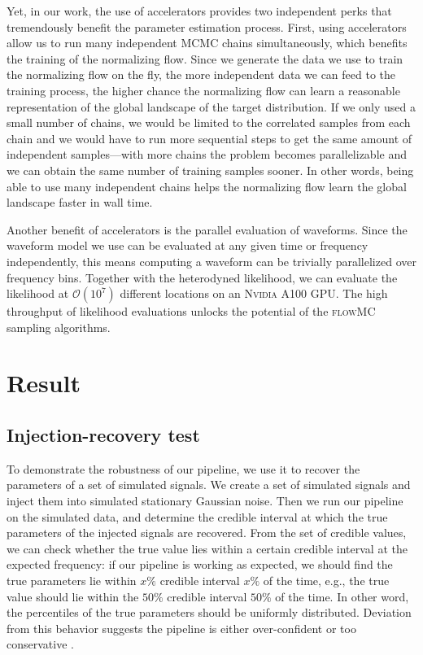 \documentclass[twocolumn]{aastex631}
\begin{document}
Yet, in our work, the use of accelerators provides two independent perks that
tremendously benefit the parameter estimation process. First, using
accelerators allow us to run many independent MCMC chains simultaneously, which
benefits the training of the normalizing flow. Since we generate the data we
use to train the normalizing flow on the fly, the more independent data we can
feed to the training process, the higher chance the normalizing flow can learn
a reasonable representation of the global landscape of the target distribution.
If we only used a small number of chains, we would be limited to the correlated
samples from each chain and we would have to run more sequential steps to get
the same amount of independent samples---with more chains the problem becomes
parallelizable and we can obtain the same number of training samples sooner. In
other words, being able to use many independent chains helps the normalizing
flow learn the global landscape faster in wall time.

Another benefit of accelerators is the parallel evaluation of waveforms. Since
the waveform model we use can be evaluated at any given time or frequency
independently, this means computing a waveform can be trivially parallelized
over frequency bins. Together with the heterodyned likelihood, we can evaluate
the likelihood at $\mathcal{O}(10^7)$ different locations on an \textsc{Nvidia}
A100 GPU.  The high throughput of likelihood evaluations unlocks the potential
of the \textsc{flowMC} sampling algorithms.

\section{Result}
\label{sec: Result}
\subsection{Injection-recovery test}

To demonstrate the robustness of our pipeline, we use it to recover the
parameters of a set of simulated signals. We create a set of simulated signals
and inject them into simulated stationary Gaussian noise.
Then we run our pipeline on the simulated data, and determine the credible
interval at which the true parameters of the injected signals are recovered. From the set of
credible values, we can check whether the true value lies within a certain
credible interval at the expected frequency: if our pipeline is working as expected, we
should find the true parameters lie within $x\%$ credible interval $x\%$ of the
time, e.g., the true value should lie within the $50\%$ credible interval $50\%$
of the time. In other word, the percentiles of the true parameters should be
uniformly distributed. Deviation from this behavior suggests the pipeline is
either over-confident or too conservative \cite{Cook2006,Talts2018}.
\end{document}
